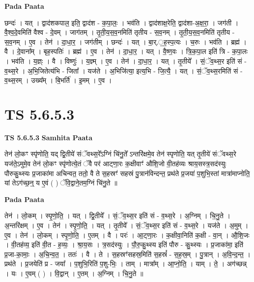 \documentclass[17pt]{extarticle}
\begin{document}
\textbf{Pada Paata} \newline

छन्दः॑ । यत् । द्वाद॑शकपाल॒ इति॒ द्वाद॑श - क॒पा॒लः॒ । भव॑ति । द्वाद॑शाक्ष॒रेति॒ द्वाद॑शा-अ॒क्ष॒रा॒ । जग॑ती । वै॒श्व॒दे॒वमिति॑ वैश्व - दे॒वम् । जाग॑तम् । तृ॒ती॒य॒स॒व॒नमिति॑ तृतीय - स॒व॒नम् । तृ॒ती॒य॒स॒व॒नमिति॑ तृतीय - स॒व॒नम् । ए॒व । तेन॑ । दा॒धा॒र॒ । जग॑तीम् । छन्दः॑ । यत् । बा॒र्.॒ह॒स्प॒त्यः । च॒रुः । भव॑ति । ब्रह्म॑ । वै । दे॒वाना᳚म् । बृह॒स्पतिः॑ । ब्रह्म॑ । ए॒व । तेन॑ । दा॒धा॒र॒ । यत् । वै॒ष्ण॒वः । त्रि॒क॒पा॒ल इति॑ त्रि - क॒पा॒लः । भव॑ति । य॒ज्ञ्ः । वै । विष्णुः॑ । य॒ज्ञ्म् । ए॒व । तेन॑ । दा॒धा॒र॒ । यत् । तृ॒तीये᳚ । सं॒ॅव॒थ्स॒र इति॑ सं - व॒थ्स॒रे । अ॒भि॒जितेत्य॑भि - जिता᳚ । यज॑ते । अ॒भिजि॑त्या॒ इत्य॒भि - जि॒त्यै॒ । यत् । सं॒ॅव॒थ्स॒रमिति॑ सं - व॒थ्स॒रम् । उख्य᳚म् । बि॒भर्ति॑ । इ॒मम् । ए॒व ।  \newline




\section*{ TS 5.6.5.3 }

\textbf{TS 5.6.5.3 } \newline
\textbf{Samhita Paata} \newline

तेन॑ लो॒कꣳ स्पृ॑णोति॒ यद् द्वि॒तीये॑ संॅवथ्स॒रे᳚ऽग्निं चि॑नु॒ते᳚ ऽन्तरि॑क्षमे॒व तेन॑ स्पृणोति॒ यत् तृ॒तीये॑ संॅवथ्स॒रे यज॑ते॒ऽमुमे॒व तेन॑ लो॒कꣳ स्पृ॑णोत्ये॒तं ॅवै पर॑ आट्णा॒रः क॒क्षीवाꣳ॑ औशि॒जो वी॒तह॑व्यः श्राय॒सस्त्र॒सद॑स्युः पौरुकु॒थ्स्यः प्र॒जाका॑मा अचिन्वत॒ ततो॒ वै ते स॒हस्रꣳ॑ सहस्रं पु॒त्रान॑विन्दन्त॒ प्रथ॑ते प्र॒जया॑ प॒शुभि॒स्तां मात्रा॑माप्नोति॒ यां तेऽग॑च्छ॒न्॒ य ए॒वं ( ) ॅवि॒द्वाने॒तम॒ग्निं चि॑नु॒ते ॥ \newline

\textbf{Pada Paata} \newline

तेन॑ । लो॒कम् । स्पृ॒णो॒ति॒ । यत् । द्वि॒तीये᳚ । सं॒ॅव॒थ्स॒र इति॑ सं - व॒थ्स॒रे । अ॒ग्निम् । चि॒नु॒ते । अ॒न्तरि॑क्षम् । ए॒व । तेन॑ । स्पृ॒णो॒ति॒ । यत् । तृ॒तीये᳚ । सं॒ॅव॒थ्स॒र इति॑ सं - व॒थ्स॒रे । यज॑ते । अ॒मुम् । ए॒व । तेन॑ । लो॒कम् । स्पृ॒णो॒ति॒ । ए॒तम् । वै । परः॑ । आ॒ट्णा॒रः । क॒क्षीवा॒निति॑ क॒क्षी - वा॒न् । औ॒शि॒जः । वी॒तह॑व्य॒ इति॑ वी॒त - ह॒व्यः॒ । श्रा॒य॒सः । त्र॒सद॑स्युः । पौ॒रु॒कु॒थ्स्य इति॑ पौरु - कु॒थ्स्यः । प्र॒जाका॑मा॒ इति॑ प्र॒जा-का॒माः॒ । अ॒चि॒न्व॒त॒ । ततः॑ । वै । ते । स॒हस्रꣳ॑सहस्र॒मिति॑ स॒हस्रं᳚ - स॒ह॒स्र॒म् । पु॒त्रान् । अ॒वि॒न्द॒न्त॒ । प्रथ॑ते । प्र॒जयेति॑ प्र - जया᳚ । प॒शुभि॒रिति॑ प॒शु-भिः॒ । ताम् । मात्रा᳚म् । आ॒प्नो॒ति॒ । याम् । ते॒ । अग॑च्छन्न् । यः । ए॒वम् ( ) । वि॒द्वान् । ए॒तम् । अ॒ग्निम् । चि॒नु॒ते ॥  \newline
\end{document}

